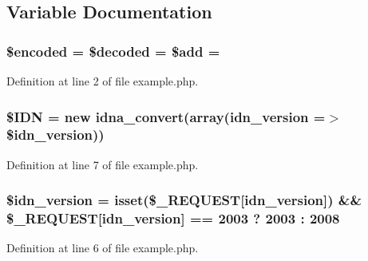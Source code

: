 \subsection{Variable Documentation}
\hypertarget{example_8php_af709b460501204e2ec7e34e96e7de576}{}
\subsubsection[{\$encoded}]{\setlength{\rightskip}{0pt plus 5cm}\$encoded = \$decoded = \$add = \textquotesingle{}\textquotesingle{}}\label{example_8php_af709b460501204e2ec7e34e96e7de576}


Definition at line 2 of file example.\+php.

\hypertarget{example_8php_aa45ac61e5ada434ea385befcd1aea16d}{}
\subsubsection[{\$\+I\+D\+N}]{\setlength{\rightskip}{0pt plus 5cm}\$I\+D\+N = new {\bf idna\+\_\+convert}(array(\textquotesingle{}idn\+\_\+version\textquotesingle{} =$>$ \$idn\+\_\+version))}\label{example_8php_aa45ac61e5ada434ea385befcd1aea16d}


Definition at line 7 of file example.\+php.

\hypertarget{example_8php_aaa64132973e10962c52265cfbee1cb9c}{}
\subsubsection[{\$idn\+\_\+version}]{\setlength{\rightskip}{0pt plus 5cm}\$idn\+\_\+version = isset(\$\+\_\+\+R\+E\+Q\+U\+E\+S\+T\mbox{[}\textquotesingle{}idn\+\_\+version\textquotesingle{}\mbox{]}) \&\& \$\+\_\+\+R\+E\+Q\+U\+E\+S\+T\mbox{[}\textquotesingle{}idn\+\_\+version\textquotesingle{}\mbox{]} == 2003 ? 2003 \+: 2008}\label{example_8php_aaa64132973e10962c52265cfbee1cb9c}


Definition at line 6 of file example.\+php.

\hypertarget{example_8php_aef99014231eb219a8c774eb4b8463fd9}{}
